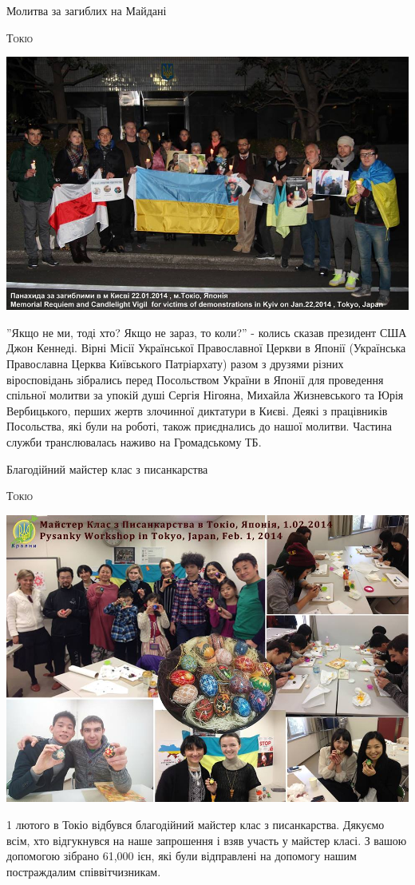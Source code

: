 \documentclass[10pt,a4paper]{article}
\newcommand{\NewsItem}[1]{%
		\usefont{T2A}{iwona}{m}{n} 
		\large #1 \vspace{4pt}
		\par \normalsize \normalfont}
\newcommand{\NewsAuthor}[1]{%
			\hfill \textsc{#1} \vspace{4pt}
			\par \normalfont}
\begin{document}
\begin{multicols}{2}

\NewsItem{Молитва за загиблих на Майдані}
\NewsAuthor{Токіо}
		\begin{center}
			\includegraphics[width=0.8\linewidth]{images/molytva-za-zagyblyh}
		\end{center}
''Якщо не ми, тоді хто? Якщо не зараз, то коли?'' - колись сказав президент США Джон Кеннеді. Вірні Місії Української Православної Церкви в Японії (Українська Православна Церква Київського Патріархату) разом з друзями різних віросповідань зібрались перед Посольством України в Японії для проведення спільної молитви за упокій душі Сергія Нігояна, Михайла Жизневського та Юрія Вербицького, перших жертв злочинної диктатури в Києві. Деякі з працівників Посольства, які були на роботі, також приєднались до нашої молитви. Частина служби транслювалась наживо на Громадському ТБ.

\vfill
\columnbreak
\NewsItem{Благодійний майстер клас з писанкарства}
\NewsAuthor{Токіо}
		\begin{center}
			\includegraphics[width=0.8\linewidth]{images/pysankarstvo}
		\end{center}
1 лютого в Токіо відбувся благодійний майстер клас з писанкарства. 
Дякуємо всім, хто відгукнувся на наше запрошення і взяв участь у майстер класі. З вашою допомогою зібрано 61,000 ієн, які були відправлені на допомогу нашим постраждалим співвітчизникам.
		
\end{multicols}
\end{document}
